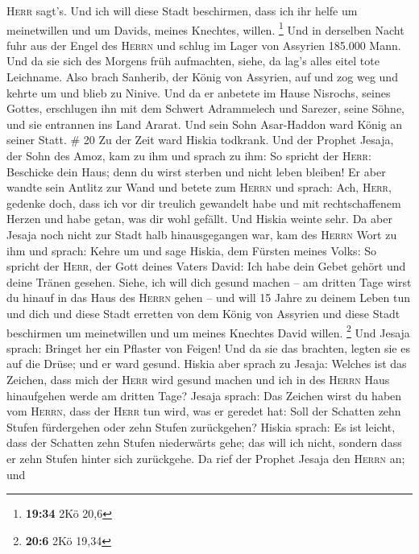 \textsc{Herr} sagt's.  Und ich will diese Stadt
beschirmen, dass ich ihr helfe um meinetwillen und um Davids, meines
Knechtes, willen. \footnote{\textbf{19:34} 2Kö 20,6}  Und
in derselben Nacht fuhr aus der Engel des \textsc{Herrn} und schlug im
Lager von Assyrien 185.000 Mann. Und da sie sich des Morgens früh
aufmachten, siehe, da lag's alles eitel tote Leichname. 
Also brach Sanherib, der König von Assyrien, auf und zog weg und kehrte
um und blieb zu Ninive.  Und da er anbetete im Hause
Nisrochs, seines Gottes, erschlugen ihn mit dem Schwert Adrammelech und
Sarezer, seine Söhne, und sie entrannen ins Land Ararat. Und sein Sohn
Asar-Haddon ward König an seiner Statt. \# 20  Zu der Zeit
ward Hiskia todkrank. Und der Prophet Jesaja, der Sohn des Amoz, kam zu
ihm und sprach zu ihm: So spricht der \textsc{Herr}: Beschicke dein
Haus; denn du wirst sterben und nicht leben bleiben!  Er
aber wandte sein Antlitz zur Wand und betete zum \textsc{Herrn} und
sprach:  Ach, \textsc{Herr}, gedenke doch, dass ich vor
dir treulich gewandelt habe und mit rechtschaffenem Herzen und habe
getan, was dir wohl gefällt. Und Hiskia weinte sehr.  Da
aber Jesaja noch nicht zur Stadt halb hinausgegangen war, kam des
\textsc{Herrn} Wort zu ihm und sprach:  Kehre um und sage
Hiskia, dem Fürsten meines Volks: So spricht der \textsc{Herr}, der Gott
deines Vaters David: Ich habe dein Gebet gehört und deine Tränen
gesehen. Siehe, ich will dich gesund machen -- am dritten Tage wirst du
hinauf in das Haus des \textsc{Herrn} gehen --  und will
15 Jahre zu deinem Leben tun und dich und diese Stadt erretten von dem
König von Assyrien und diese Stadt beschirmen um meinetwillen und um
meines Knechtes David willen. \footnote{\textbf{20:6} 2Kö 19,34}
 Und Jesaja sprach: Bringet her ein Pflaster von Feigen!
Und da sie das brachten, legten sie es auf die Drüse; und er ward
gesund.  Hiskia aber sprach zu Jesaja: Welches ist das
Zeichen, dass mich der \textsc{Herr} wird gesund machen und ich in des
\textsc{Herrn} Haus hinaufgehen werde am dritten Tage? 
Jesaja sprach: Das Zeichen wirst du haben vom \textsc{Herrn}, dass der
\textsc{Herr} tun wird, was er geredet hat: Soll der Schatten zehn
Stufen fürdergehen oder zehn Stufen zurückgehen?  Hiskia
sprach: Es ist leicht, dass der Schatten zehn Stufen niederwärts gehe;
das will ich nicht, sondern dass er zehn Stufen hinter sich zurückgehe.
 Da rief der Prophet Jesaja den \textsc{Herrn} an; und
